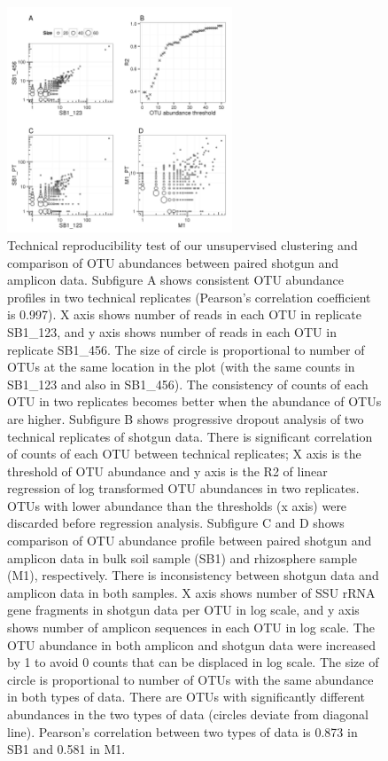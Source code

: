 \documentclass[]{msu-thesis}
\begin{document}
\begin{figure}[tbph!]
  \centering
  \includegraphics[width=0.60\textwidth]{figs/chap2_figS4}
  \caption[Technical reproducibility test and comparison of OTU abundances between paired shotgun and amplicon data]{Technical reproducibility test of our unsupervised clustering and comparison of OTU abundances between paired shotgun and amplicon data. Subfigure A shows consistent OTU abundance profiles in two technical replicates (Pearson’s correlation coefficient is 0.997). X axis shows number of reads in each OTU in replicate SB1\_123, and y axis shows number of reads in each OTU in replicate SB1\_456. The size of circle is proportional to number of OTUs at the same location in the plot (with the same counts in SB1\_123 and also in SB1\_456).  The consistency of counts of each OTU in two replicates becomes better when the abundance of OTUs are higher. Subfigure B shows progressive dropout analysis of two technical replicates of shotgun data. There is significant correlation of counts of each OTU between technical replicates; X axis is the threshold of OTU abundance and y axis is the R2 of linear regression of log transformed OTU abundances in two replicates. OTUs with lower abundance than the thresholds (x axis) were discarded before regression analysis. Subfigure C and D shows comparison of OTU abundance profile between paired shotgun and amplicon data in bulk soil sample (SB1) and rhizosphere sample (M1), respectively. There is inconsistency between shotgun data and amplicon data in both samples. X axis shows number of SSU rRNA gene fragments in shotgun data per OTU in log scale, and y axis shows number of amplicon sequences in each OTU in log scale. The OTU abundance in both amplicon and shotgun data were increased by 1 to avoid 0 counts that can be displaced in log scale. The size of circle is proportional to number of OTUs with the same abundance in both types of data. There are OTUs with significantly different abundances in the two types of data (circles deviate from diagonal line). Pearson’s correlation between two types of data is 0.873 in SB1 and 0.581 in M1.}
  \label{fig:chap2FigS4}
\end{figure}
\end{document}
